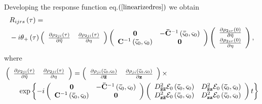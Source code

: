 \documentclass[aps,preprint]{revtex4}%
\begin{document}
Developing the response function eq.$\left(  \ref{linearizedres}\right)  $ we
obtain
\begin{align}
&  R_{ijrs}\left(  \tau\right)  =\nonumber\\
&  -i\theta_{+}\left(  \tau\right)  \left(
\begin{array}
[c]{cc}%
\frac{\partial\rho_{2ji}\left(  \tau\right)  }{\partial\mathbf{\bar{\eta}}} &
\frac{\partial\rho_{2ji}\left(  \tau\right)  }{\partial\mathbf{\eta}}%
\end{array}
\right)  \left(
\begin{array}
[c]{cc}%
\mathbf{0} & -\mathbf{\bar{C}}^{-1}\left(  \mathbf{\bar{\varsigma}}%
_{0},\mathbf{\varsigma}_{0}\right) \\
\mathbf{C}^{-1}\left(  \mathbf{\bar{\varsigma}}_{0},\mathbf{\varsigma}%
_{0}\right)  & \mathbf{0}%
\end{array}
\right)  \left(
\begin{array}
[c]{c}%
\frac{\partial\rho_{2sr}\left(  0\right)  }{\partial\mathbf{\bar{\eta}}}\\
\frac{\partial\rho_{2sr}\left(  0\right)  }{\partial\mathbf{\eta}}%
\end{array}
\right)  ,
\end{align}
where
\begin{align}
&  \left(
\begin{array}
[c]{cc}%
\frac{\partial\rho_{2ji}\left(  \tau\right)  }{\partial\mathbf{\bar{\eta}}} &
\frac{\partial\rho_{2ji}\left(  \tau\right)  }{\partial\mathbf{\eta}}%
\end{array}
\right)  =\left(
\begin{array}
[c]{cc}%
\frac{\partial\rho_{ji}\left(  \mathbf{\bar{\varsigma}}_{0},\mathbf{\varsigma
}_{0}\right)  }{\partial\mathbf{\bar{z}}} & \frac{\partial\rho_{ji}\left(
\mathbf{\bar{\varsigma}}_{0},\mathbf{\varsigma}_{0}\right)  }{\partial
\mathbf{z}}%
\end{array}
\right)  \times\nonumber\\
&  \qquad\exp\left\{  -i\left(
\begin{array}
[c]{cc}%
\mathbf{0} & -\mathbf{\bar{C}}^{-1}\left(  \mathbf{\bar{\varsigma}}%
_{0},\mathbf{\varsigma}_{0}\right) \\
\mathbf{C}^{-1}\left(  \mathbf{\bar{\varsigma}}_{0},\mathbf{\varsigma}%
_{0}\right)  & \mathbf{0}%
\end{array}
\right)  \left(
\begin{array}
[c]{cc}%
D_{\mathbf{\bar{z}\bar{z}}}^{2}\mathcal{E}_{0}\left(  \mathbf{\bar{\varsigma}%
}_{0},\mathbf{\varsigma}_{0}\right)  & D_{\mathbf{\bar{z}z}}^{2}%
\mathcal{E}_{0}\left(  \mathbf{\bar{\varsigma}}_{0},\mathbf{\varsigma}%
_{0}\right) \\
D_{\mathbf{z\bar{z}}}^{2}\mathcal{E}_{0}\left(  \mathbf{\bar{\varsigma}}%
_{0},\mathbf{\varsigma}_{0}\right)  & D_{\mathbf{zz}}^{2}\mathcal{E}%
_{0}\left(  \mathbf{\bar{\varsigma}}_{0},\mathbf{\varsigma}_{0}\right)
\end{array}
\right)  t\right\}
\end{align}
\end{document}
